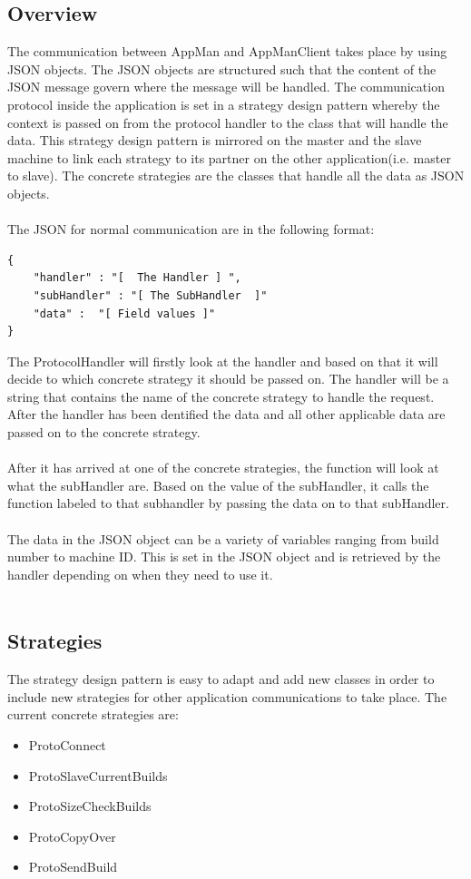 \documentclass[a4paper,12pt,final]{article}
\begin{document}
\subsection{Overview}
The communication between AppMan and AppManClient takes place 
by using JSON objects. The JSON objects are structured such that the 
content of the JSON message govern where the message will be handled. 
The communication protocol inside the application is set in a strategy design pattern
whereby the context is passed on from the protocol handler to the class that will 
handle the data. This strategy design pattern is mirrored on the master and the slave
machine to link each strategy to its partner on the other application(i.e. master to slave).
The concrete strategies are the classes that handle all the data as JSON objects.\\
\textbf{\\}
The JSON for normal communication are in the following format:
\begin{verbatim}
{
	"handler" : "[  The Handler ] ",
	"subHandler" : "[ The SubHandler  ]"
	"data" :  "[ Field values ]"
}
\end{verbatim}
The ProtocolHandler will firstly look at the handler and based on that it will decide to
which concrete strategy it should be passed on. The handler will be a string that contains
the name of the concrete strategy to handle the request. After the handler has been 
dentified the data and all other applicable data are passed on to the concrete strategy.\\
\textbf{\\}
After it has arrived at one of the concrete strategies, the function will look at what
the subHandler are. Based on the value of the subHandler, it calls the function labeled
to that subhandler by passing the data on to that subHandler.\\
\textbf{\\}
The data in the JSON object can be a variety of variables ranging from build number
to machine ID. This is set in the JSON object and is retrieved by the handler depending
on when they need to use it.\\
\textbf{\\}

\subsection{Strategies}
The strategy design pattern is easy to adapt and add new classes in order to include
new strategies for other application communications to take place. The current concrete
strategies are:
\begin{itemize}
\item ProtoConnect
\item ProtoSlaveCurrentBuilds
\item ProtoSizeCheckBuilds
\item ProtoCopyOver
\item ProtoSendBuild
\end{itemize}
\end{document}
